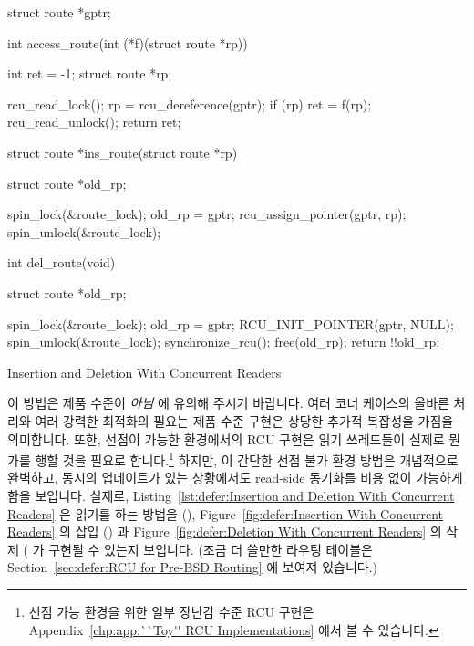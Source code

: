 \begin{listing}[tbp]
{ \scriptsize
\begin{verbbox}[\LstLineNo]
struct route *gptr;

int access_route(int (*f)(struct route *rp))
{
  int ret = -1;
  struct route *rp;

  rcu_read_lock();
  rp = rcu_dereference(gptr);
  if (rp)
  	ret = f(rp);
  rcu_read_unlock();
  return ret;
}

struct route *ins_route(struct route *rp)
{
  struct route *old_rp;

  spin_lock(&route_lock);
  old_rp = gptr;
  rcu_assign_pointer(gptr, rp);
  spin_unlock(&route_lock);
}

int del_route(void)
{
  struct route *old_rp;

  spin_lock(&route_lock);
  old_rp = gptr;
  RCU_INIT_POINTER(gptr, NULL);
  spin_unlock(&route_lock);
  synchronize_rcu();
  free(old_rp);
  return !!old_rp;
}
\end{verbbox}
}
\centering
\theverbbox
\caption{Insertion and Deletion With Concurrent Readers}
\label{lst:defer:Insertion and Deletion With Concurrent Readers}
\end{listing}

이 방법은 제품 수준이 \emph{아님} 에 유의해 주시기 바랍니다.
여러 코너 케이스의 올바른 처리와 여러 강력한 최적화의 필요는 제품 수준 구현은
상당한 추가적 복잡성을 가짐을 의미합니다.
또한, 선점이 가능한 환경에서의 RCU 구현은 읽기 쓰레드들이 실제로 뭔가를 행할
것을 필요로 합니다.\footnote{
	선점 가능 환경을 위한 일부 장난감 수준 RCU 구현은
	Appendix~\ref{chp:app:``Toy'' RCU Implementations} 에서 볼 수
	있습니다.}
하지만, 이 간단한 선점 불가 환경 방법은 개념적으로 완벽하고, 동시의 업데이트가
있는 상황에서도 read-side 동기화를 비용 없이 가능하게 함을 보입니다.
실제로,
Listing~\ref{lst:defer:Insertion and Deletion With Concurrent Readers}
은 읽기를 하는 방법을 (),
Figure~\ref{fig:defer:Insertion With Concurrent Readers}
의 삽입 () 과
Figure~\ref{fig:defer:Deletion With Concurrent Readers}
의 삭제 ( 가 구현될 수 있는지 보입니다.
(조금 더 쓸만한 라우팅 테이블은
Section~\ref{sec:defer:RCU for Pre-BSD Routing} 에 보여져 있습니다.)
\iffalse

